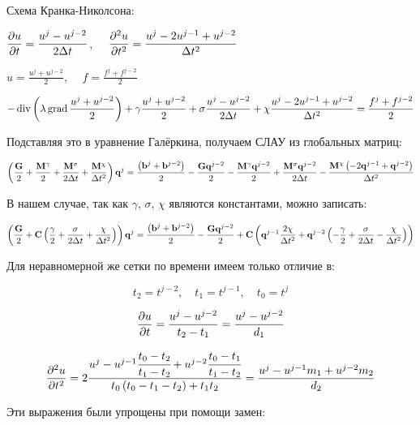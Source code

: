 Схема Кранка-Николсона:

\begin{center}
$\displaystyle \frac{\partial u}{\partial t} = \frac{u^j-u^{j-2}}{2\Delta t} $, $\displaystyle \quad \frac{\partial^{2} u}{\partial t^{2}} = \frac{u^j-2u^{j-1}+u^{j-2}}{\Delta t^2} $
\end{center}

\begin{center}
$\displaystyle u = \frac{u^j+u^{j-2}}{2} $, $\displaystyle \quad f = \frac{f^j+f^{j-2}}{2} $
\end{center}

\begin{center}
$\displaystyle -\operatorname{div}\left(\lambda \operatorname{grad}\frac{u^j+u^{j-2}}{2}\right) + \gamma \frac{u^j+u^{j-2}}{2} + \sigma \frac{u^j - u^{j-2}}{2\Delta t} + \chi \frac{u^j-2u^{j-1}+u^{j-2}}{\Delta t^2} = \frac{f^j+f^{j-2}}{2} $
\end{center}

Подставляя это в уравнение Галёркина, получаем СЛАУ из глобальных матриц:

$$ \left(\frac{\mathbf{G}}{2} + \frac{\mathbf{M}^\gamma}{2} + \frac{\mathbf{M}^\sigma}{2\Delta t} + \frac{\mathbf{M}^\chi}{\Delta t^2}\right)\mathbf{q}^j = \frac{\left(\mathbf{b}^j+\mathbf{b}^{j-2}\right)}{2} - \frac{\mathbf{G}\mathbf{q}^{j-2}}{2} - \frac{\mathbf{M}^\gamma\mathbf{q}^{j-2}}{2} + \frac{\mathbf{M}^\sigma \mathbf{q}^{j-2}}{2\Delta t} - \frac{\mathbf{M}^\chi \left(-2\mathbf{q}^{j-1} + \mathbf{q}^{j-2}\right)}{\Delta t^2} $$

В нашем случае, так как $\gamma$, $\sigma$, $\chi$ являются константами, можно записать:

$$ \left(\frac{\mathbf{G}}{2} + \mathbf{C}\left(\frac{\gamma}{2} + \frac{\sigma}{2\Delta t} + \frac{\chi}{\Delta t^2}\right)\right)\mathbf{q}^j = \frac{\left(\mathbf{b}^j+\mathbf{b}^{j-2}\right)}{2} - \frac{\mathbf{G}\mathbf{q}^{j-2}}{2} + \mathbf{C}\left(\mathbf{q}^{j-1}\frac{2\chi}{\Delta t^2} + \mathbf{q}^{j-2}\left(-\frac{\gamma}{2}+\frac{\sigma}{2\Delta t}-\frac{\chi}{\Delta t^2}\right)\right) $$

Для неравномерной же сетки по времени имеем только отличие в:

$$ t_2 = t^{j-2},\quad t_1 = t^{j-1},\quad t_0 = t^j $$

$$ \frac{\partial u}{\partial t} = \frac{u^j-u^{j-2}}{t_2-t_1} = \frac{u^j-u^{j-2}}{d_1} $$

$$ \frac{\partial^{2} u}{\partial t^{2}} = 2\frac{u^j-u^{j-1}\cfrac{t_0-t_2}{t_1-t_2}+u^{j-2}\cfrac{t_0-t_1}{t_1-t_2}}{t_0\left(t_0-t_1-t_2\right) + t_1 t_2} = \frac{u^j-u^{j-1}m_1+u^{j-2}m_2}{d_2} $$

Эти выражения были упрощены при помощи замен:

